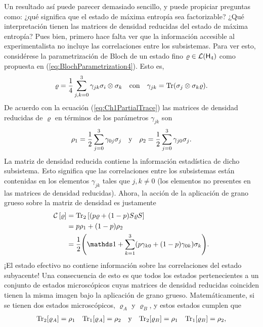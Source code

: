 Un resultado así puede parecer demasiado sencillo, y puede propiciar preguntas como: ¿qué significa que el estado de máxima entropía sea factorizable? ¿Qué interpretación tienen las matrices de densidad reducidas del estado de máxima entropía? Pues bien, primero hace falta ver que la información accesible al experimentalista no incluye las correlaciones entre los subsistemas. Para ver esto, considérese la parametrización de Bloch de un estado fino $\varrho\in\mathcal{L}({\sf H}_{4})$ como propuesta en (\ref{eq:BlochParametrization4}). Esto es,
\begin{align}\label{}
    \varrho=\frac{1}{4}\sum_{j,k=0}^{3}\gamma_{jk}\sigma_{i}\otimes \sigma_{k} & & \text{con} & & \gamma_{jk}=\Tr(\sigma_{j}\otimes \sigma_{k}\varrho).\nonumber
\end{align}
De acuerdo con la ecuación (\ref{eq:Ch1PartialTrace}) las matrices de densidad reducidas de $\varrho$ en términos de los parámetros $\gamma_{jk}$ son
\begin{align}
    \rho_{1}=\frac{1}{2}\sum_{j=0}^{3}\gamma_{0j}\sigma_{j} & & \text{y} & & \rho_{2}=\frac{1}{2}\sum_{j=0}^{3}\gamma_{j0}\sigma_{j}.\nonumber
\end{align}
La matriz de densidad reducida contiene la información estadística de dicho subsistema. Esto significa que las correlaciones entre los subsistemas están contenidas en los elementos $\gamma_{jk}$ tales que $j,k\neq 0$ (los elementos no presentes en las matrices de densidad reducidas). Ahora, la acción de la aplicación de grano grueso sobre la matriz de densidad es justamente
\begin{align}
    \CG{\varrho}&=\Tr_{2}\qty[(p \varrho + (1-p)S\varrho S]\nonumber\\
    &=p\rho_{1}+(1-p)\rho_{2}\nonumber\\
    &=\frac{1}{2}\qty(\Id+\sum_{k=1}^{3}(p\gamma_{k0}+(1-p)\gamma_{0k})\sigma_{k}).\nonumber
\end{align}
¡El estado efectivo no contiene información sobre las correlaciones del estado subyacente! Una consecuencia de esto es que todos los estados pertenecientes a un conjunto de estados microscópicos cuyas matrices de densidad reducidas coinciden tienen la misma imagen bajo la aplicación de grano grueso. Matemáticamente, si se tienen dos estados microscópicos, $\varrho_{A}$ y $\varrho_{B}$, y estos estados cumplen que
\begin{align}
    \Tr_{2}[\varrho_{A}]=\rho_{1} & & \Tr_{1}[\varrho_{A}]=\rho_{2} & & \text{y} & &\Tr_{2}[\varrho_{B}]=\rho_{1} & & \Tr_{1}[\varrho_{B}]=\rho_{2},\nonumber
\end{align}
